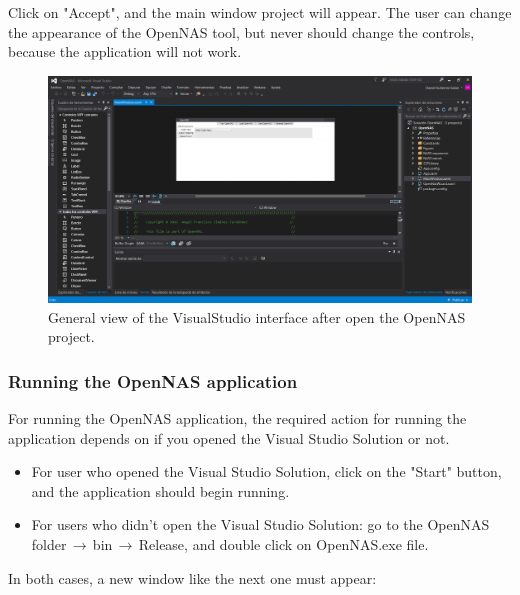 Click on "Accept", and the main window project will appear. The user can change the appearance of the OpenNAS tool, but never should change the controls, because the application will not work.

\begin{figure}[H]
\centering
\includegraphics[width=1\textwidth]{images/Img12_VS_Proyecto.PNG}
\caption{\label{fig:VS_project}General view of the VisualStudio interface after open the OpenNAS project.}
\end{figure}

\subsubsection{\label{subsubsec:run_opennas}Running the OpenNAS application}

For running the OpenNAS application, the required action for running the application depends on if you opened the Visual Studio Solution or not.

\begin{itemize}
    \item For user who opened the Visual Studio Solution, click on the "Start" button, and the application should begin running. 
    \item For users who didn't open the Visual Studio Solution: go to the OpenNAS folder$\,\to\,$bin$\,\to\,$Release, and double click on OpenNAS.exe file.
\end{itemize}

In both cases, a new window like the next one must appear:

